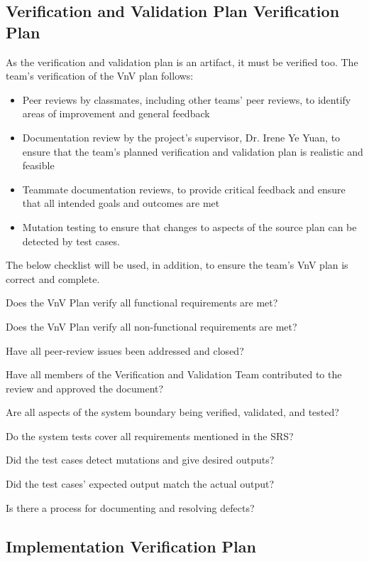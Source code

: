 \documentclass[12pt, titlepage]{article}
\begin{document}
\subsection{Verification and Validation Plan Verification Plan}

As the verification and validation plan is an artifact, it must be verified too. The team's verification of the VnV plan follows:
\begin{itemize}
  \item Peer reviews by classmates, including other teams' peer reviews, to identify areas of improvement and general feedback
  \item Documentation review by the project's supervisor, Dr. Irene Ye Yuan, to ensure that the team's planned verification and validation plan is realistic and feasible
  \item Teammate documentation reviews, to provide critical feedback and ensure that all intended goals and outcomes are met
  \item Mutation testing to ensure that changes to aspects of the source plan can be detected by test cases.
\end{itemize}

The below checklist will be used, in addition, to ensure the team's VnV plan is correct and complete.

\begin{todolist}
\item Does the VnV Plan verify all functional requirements are met?
\item Does the VnV Plan verify all non-functional requirements are met?
\item Have all peer-review issues been addressed and closed?
\item Have all members of the Verification and Validation Team contributed to the review and approved the document?
\item Are all aspects of the system boundary being verified, validated, and tested?
\item Do the system tests cover all requirements mentioned in the SRS?
\item Did the test cases detect mutations and give desired outputs?
\item Did the test cases' expected output match the actual output?
\item Is there a process for documenting and resolving defects?
\end{todolist}

\subsection{Implementation Verification Plan}
\end{document}
